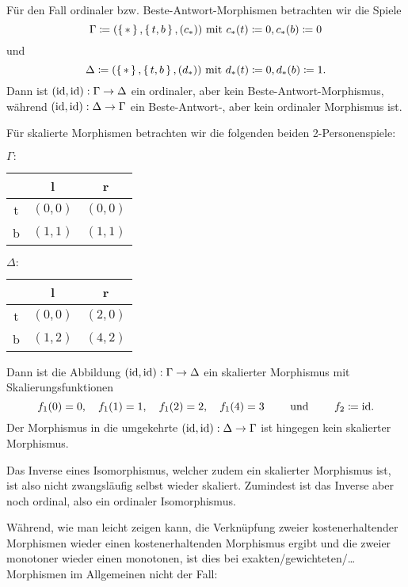 \begin{bsp}
	Für den Fall ordinaler bzw. Beste-Antwort-Morphismen betrachten wir die Spiele 
		\[\Gamma \coloneqq (\set{\ast}, \set{t, b}, (c_\ast)) \text{ mit } c_\ast(t) \coloneqq 0, c_\ast(b) \coloneqq 0\]
	und 
		\[\Delta \coloneqq (\set{\ast}, \set{t, b}, (d_\ast)) \text{ mit } d_\ast(t) \coloneqq 0, d_\ast(b) \coloneqq 1.\]
	Dann ist $(\mathrm{id}, \mathrm{id}): \Gamma \to \Delta$ ein ordinaler, aber kein Beste-Antwort-Morphismus, während $(\mathrm{id}, \mathrm{id}): \Delta \to \Gamma$  ein Beste-Antwort-, aber kein ordinaler Morphismus ist.
\end{bsp}

\begin{bsp}\label{bsp:GegenbspSkalUndIsoIstSkalIso}
	Für skalierte Morphismen betrachten wir die folgenden beiden 2-Personenspiele:
	\begin{center}
		$\Gamma:$ \quad
		\begin{tabular}{c||c|c}
			& l 		& r 		\\\hline\hline
			t	& $(0,0)$	& $(0,0)$	\\\hline
			b	& $(1,1)$	& $(1,1)$ 
		\end{tabular}\hspace{5em}
		$\Delta:$ \quad
		\begin{tabular}{c||c|c}
			& l 		& r 		\\\hline\hline
			t	& $(0,0)$	& $(2,0)$	\\\hline
			b	& $(1,2)$	& $(4,2)$ 
		\end{tabular}
	\end{center}
	Dann ist die Abbildung $(\mathrm{id}, \mathrm{id}): \Gamma \to \Delta$ ein skalierter Morphismus mit Skalierungsfunktionen 
		\[f_1(0) = 0,\hspace{1em} f_1(1) = 1,\hspace{1em} f_1(2) = 2,\hspace{1em} f_1(4)=3 \qquad\text{ und }\qquad f_2 \coloneqq \mathrm{id}.\]
	Der Morphismus in die umgekehrte $(\mathrm{id}, \mathrm{id}): \Delta \to \Gamma$ ist hingegen kein skalierter Morphismus.
\end{bsp}

\begin{beob}\label{beob:InverseVonSkalMorphSindOrd}
	Das Inverse eines Isomorphismus, welcher zudem ein skalierter Morphismus ist, ist also nicht zwangsläufig selbst wieder skaliert. Zumindest ist das Inverse aber noch ordinal, also ein ordinaler Isomorphismus.
\end{beob}

Während, wie man leicht zeigen kann, die Verknüpfung zweier kostenerhaltender Morphismen wieder einen kostenerhaltenden Morphismus ergibt und die zweier monotoner wieder einen monotonen, ist dies bei exakten/gewichteten/\dots{} Morphismen im Allgemeinen nicht der Fall: 

